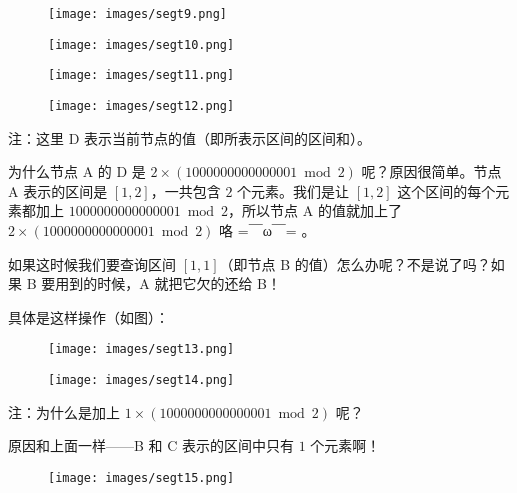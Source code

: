\begin{figure}[h]
\centering
\texttt{[image: images/segt9.png]} 

\end{figure}

\begin{figure}[h]
\centering
\texttt{[image: images/segt10.png]} 

\end{figure}

\begin{figure}[h]
\centering
\texttt{[image: images/segt11.png]} 

\end{figure}

\begin{figure}[h]
\centering
\texttt{[image: images/segt12.png]} 

\end{figure}

注：这里 D 表示当前节点的值（即所表示区间的区间和）。

为什么节点 A 的 D 是 $2\times (1000000000000001\bmod 2)$ 呢？原因很简单。节点 A 表示的区间是 $[1,2]$，一共包含 $2$ 个元素。我们是让 $[1,2]$ 这个区间的每个元素都加上 $1000000000000001\bmod 2$，所以节点 A 的值就加上了 $2\times (1000000000000001\bmod 2)$ 咯 =￣ω￣= 。

如果这时候我们要查询区间 $[1,1]$（即节点 B 的值）怎么办呢？不是说了吗？如果 B 要用到的时候，A 就把它欠的还给 B！

具体是这样操作（如图）：

\begin{figure}[h]
\centering
\texttt{[image: images/segt13.png]} 

\end{figure}

\begin{figure}[h]
\centering
\texttt{[image: images/segt14.png]} 

\end{figure}

注：为什么是加上 $1\times (1000000000000001\bmod 2)$ 呢？

原因和上面一样——B 和 C 表示的区间中只有 $1$ 个元素啊！

\begin{figure}[h]
\centering
\texttt{[image: images/segt15.png]} 

\end{figure}

